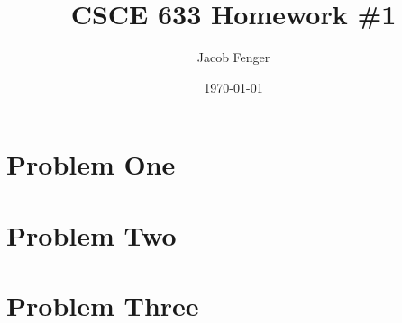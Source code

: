 \documentclass[12pt]{article}
\begin{document}
\title{CSCE 633 Homework \#1}
\author{Jacob Fenger}
\date{\today}
\maketitle

\tableofcontents

\section{Problem One}

\section{Problem Two}

\section{Problem Three}
\end{document}
